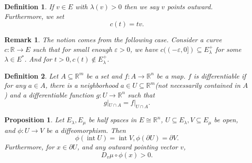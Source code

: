 \documentclass[8pt]{article}
\newtheorem{proposition}{Proposition}[section]
\newtheorem{definition}{Definition}[section]
\newtheorem{remark}{Remark}[section]
\DeclareMathOperator{\interior}{int}
\newcommand{\R}[0]{\mathbb{R}}
\begin{document}
\begin{definition}
  If $v\in E$ with $\lambda(v)>0$ then we say $v$ points outward. Furthermore, we set 
  \begin{equation*}
    c(t) = tv.
  \end{equation*}
\end{definition}

\begin{remark}
  The notion comes from the following case. Consider a curve $c:\R\to E$ such that for small enough $\varepsilon>0$, we have $c((-\varepsilon,0])\subseteq E_\lambda^+$ for some $\lambda\in E^*$. And for $t>0, c(t)\not\in E_\lambda^+$. 
\end{remark}

\begin{definition}
  Let $A\subseteq\R^m$ be a set and $f:A\to\R^n$ be a map. $f$ is differentiable if for any $a\in A$, there is a neighborhood $a\in U\subseteq\R^m$(not necessarily contained in $A$) and a differentiable function $g:U\to\R^n$ such that 
  \begin{equation*}
    g|_{U\cap A} = f|_{U\cap A}.
  \end{equation*}
\end{definition}

\begin{proposition}
  Let $E_\lambda,E_\mu$ be half spaces in $E\cong \R^n$, $U\subseteq E_\lambda,V\subseteq E_\mu$ be open, and $\phi:U\to V$ be a diffeomorphism. Then 
  \begin{equation*}
    \phi(\interior U) = \interior V, \phi(\partial U) = \partial V.
  \end{equation*}
  Furthermore, for $x\in\partial U$, and any outward pointing vector $v$, 
  \begin{equation*}
    D_v\mu\circ\phi(x)>0.
  \end{equation*}
\end{proposition}
\end{document}

